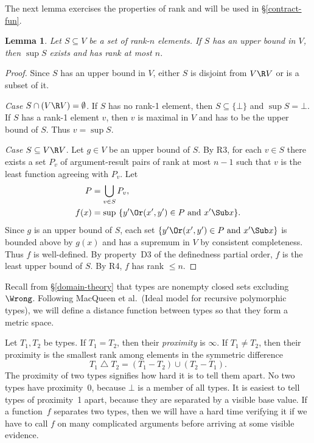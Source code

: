 \documentclass{amsart}
\newtheorem{lemma}[subsection]{Lemma}
\theoremstyle{definition}
\begin{document}
The next lemma exercises the properties of rank and will be used
in \S\ref{contract-fun}.

\begin{lemma}
\label{sup-rank}
Let $S\subseteq V$ be a set of rank-$n$ elements. If\/ $S$ has an
upper bound in $V$, then $\sup S$ exists and has rank at most $n$.
\end{lemma}

\begin{proof}
Since $S$ has an upper bound in $V$, either $S$ is disjoint from
$V\R V$ or is a subset of it.

\emph{Case} $S\cap(V\R V)=\emptyset$. If $S$ has no rank-1
element, then $S\subseteq\{\bot\}$ and $\sup S=\bot$. If $S$ has a rank-1
element $v$, then $v$ is maximal in $V$ and has to be the upper
bound of $S$. Thus $v=\sup S$.

\emph{Case} $S\subseteq V\R V$. Let $g\in V$ be an upper bound of
$S$. By R3, for each $v\in S$ there exists a set $P_v$ of
argument-result pairs of rank at most $n-1$ such that $v$ is the
least function agreeing with $P_v$. Let
\begin{align*}
P &= \bigcup_{v\in S} P_v,\\
f(x) &= \sup\ \{y' \Or (x',y')\in P\text{ and } x'\Sub x \}.
\end{align*}
Since $g$ is an upper bound of $S$, each set $\{y' \Or (x',y')\in
P\text{ and } x'\Sub x \}$ is bounded above by $g(x)$ and has a
supremum in $V$ by consistent completeness. Thus $f$ is
well-defined. By property~D3 of the definedness partial order,
$f$ is the least upper bound of $S$. By R4, $f$ has rank $\le n$.
\end{proof}



Recall from \S\ref{domain-theory} that types are nonempty closed
sets excluding $\Wrong$. Following MacQueen et al.\ (Ideal model
for recursive polymorphic types), we will define a distance
function between types so that they form a metric space.

Let $T_1,T_2$ be types. If $T_1=T_2$, then their \emph{proximity}
is $\infty$. If $T_1\neq T_2$, then their proximity is the
smallest rank among elements in the symmetric difference
\[
T_1 \operatorname\triangle T_2 = (T_1 - T_2)\cup (T_2 - T_1).
\]
The proximity of two types signifies how hard it is to tell them
apart. No two types have proximity~0, because $\bot$ is a member
of all types. It is easiest to tell types of proximity~1 apart,
because they are separated by a visible base value. If a
function~$f$ separates two types, then we will have a hard time
verifying it if we have to call $f$ on many complicated arguments
before arriving at some visible evidence.
\end{document}
